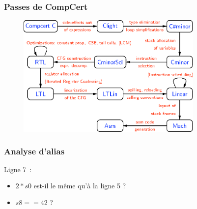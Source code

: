 \documentclass[xetex]{beamer}
\begin{document}

\begin{frame}[fragile]

\frametitle{Passes de CompCert}

\begin{figure}[H]
\centering
\includegraphics[height=6cm]{passes.eps}
\end{figure}

\end{frame}


\begin{frame}[fragile]

\frametitle{Analyse d'alias}



Ligne 7~:

\begin{itemize}

\pause

\item {}$2 * s0$ est-il le même qu'à la ligne 5 ?

\pause

\item {}$s8 == 42$ ?

\end{itemize}

\end{frame}

\end{document}
